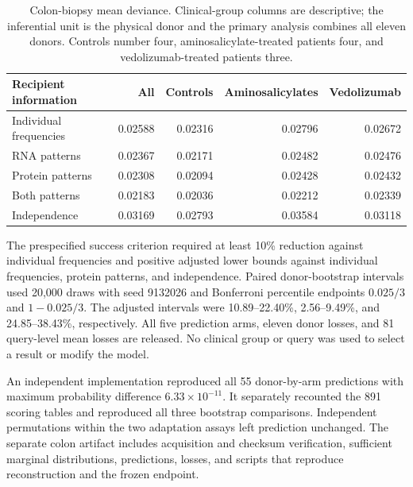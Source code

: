 \begin{table}[htbp]
\caption{Colon-biopsy mean deviance. Clinical-group columns are descriptive;
the inferential unit is the physical donor and the primary analysis combines
all eleven donors. Controls number four, aminosalicylate-treated patients four,
and vedolizumab-treated patients three.}
\centering\small
\begin{tabularx}{\textwidth}{@{}Xrrrr@{}}
\toprule
Recipient information & All & Controls & Aminosalicylates & Vedolizumab\\
\midrule
Individual frequencies & 0.02588 & 0.02316 & 0.02796 & 0.02672\\
RNA patterns & 0.02367 & 0.02171 & 0.02482 & 0.02476\\
Protein patterns & 0.02308 & 0.02094 & 0.02428 & 0.02432\\
Both patterns & 0.02183 & 0.02036 & 0.02212 & 0.02339\\
Independence & 0.03169 & 0.02793 & 0.03584 & 0.03118\\
\bottomrule
\end{tabularx}
\end{table}

The prespecified success criterion required at least 10\% reduction against
individual frequencies and positive adjusted lower bounds against individual
frequencies, protein patterns, and independence. Paired donor-bootstrap
intervals used 20,000 draws with seed 9132026 and Bonferroni percentile endpoints
$0.025/3$ and $1-0.025/3$. The adjusted intervals were 10.89--22.40\%,
2.56--9.49\%, and 24.85--38.43\%, respectively. All five prediction arms,
eleven donor losses, and 81 query-level mean losses are released. No clinical
group or query was used to select a result or modify the model.

An independent implementation reproduced all 55 donor-by-arm predictions
with maximum probability difference $6.33\times10^{-11}$. It separately
recounted the 891 scoring tables and reproduced all three bootstrap comparisons.
Independent permutations within the two adaptation assays left prediction
unchanged. The separate colon artifact includes acquisition and checksum
verification, sufficient marginal distributions, predictions, losses, and
scripts that reproduce reconstruction and the frozen endpoint.
